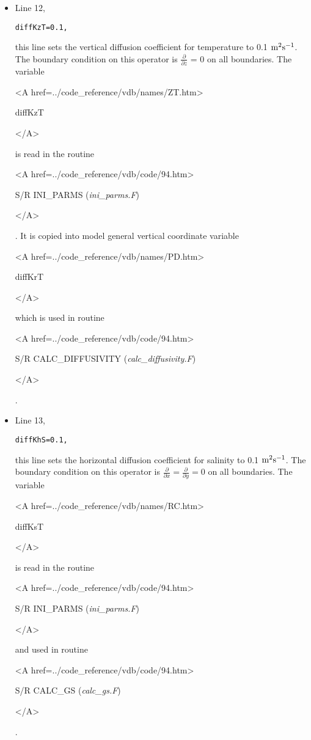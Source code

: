 \begin{itemize}
\item Line 12,
\begin{verbatim}
diffKzT=0.1,
\end{verbatim}
this line sets the vertical diffusion coefficient for temperature
to 0.1 ${\rm m^{2}s^{-1}}$. The boundary condition on this
operator is $\frac{\partial}{\partial z}$ = 0 on all boundaries.
The variable
{\bf
\begin{rawhtml} <A href=../code_reference/vdb/names/ZT.htm> \end{rawhtml}
diffKzT
\begin{rawhtml} </A>\end{rawhtml}
}
is read in the routine
{\it
\begin{rawhtml} <A href=../code_reference/vdb/code/94.htm> \end{rawhtml}
S/R INI\_PARMS ({\it ini\_parms.F})
\begin{rawhtml} </A>\end{rawhtml}
}.
It is copied into model general vertical coordinate variable
{\bf
\begin{rawhtml} <A href=../code_reference/vdb/names/PD.htm> \end{rawhtml}
diffKrT
\begin{rawhtml} </A>\end{rawhtml}
} which is used in routine 
{\it 
\begin{rawhtml} <A href=../code_reference/vdb/code/94.htm> \end{rawhtml}
S/R CALC\_DIFFUSIVITY ({\it calc\_diffusivity.F})
\begin{rawhtml} </A>\end{rawhtml}
}.


\item Line 13,
\begin{verbatim}
diffKhS=0.1,
\end{verbatim}
this line sets the horizontal diffusion coefficient for salinity
to 0.1 $\rm m^{2}s^{-1}$. The boundary condition on this
operator is $\frac{\partial}{\partial x}=\frac{\partial}{\partial y}=0$ on
all boundaries.
The variable
{\bf
\begin{rawhtml} <A href=../code_reference/vdb/names/RC.htm> \end{rawhtml}
diffKsT
\begin{rawhtml} </A>\end{rawhtml}
}
is read in the routine
{\it
\begin{rawhtml} <A href=../code_reference/vdb/code/94.htm> \end{rawhtml}
S/R INI\_PARMS ({\it ini\_parms.F})
\begin{rawhtml} </A>\end{rawhtml}
} and used in routine 
{\it
\begin{rawhtml} <A href=../code_reference/vdb/code/94.htm> \end{rawhtml}
S/R CALC\_GS ({\it calc\_gs.F})
\begin{rawhtml} </A>\end{rawhtml}
}.



\end{itemize}
